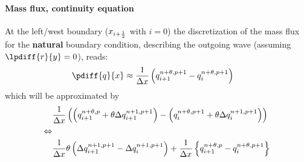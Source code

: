 \paragraph*{Mass flux, continuity equation}
At the left/west boundary ($x_{i+\frac{1}{2}}$ with $i=0$) the discretization of the mass flux for the \textbf{natural} boundary condition, describing the outgoing wave (assuming $\lpdiff{r}{y} = 0$), reads:
\begin{align}
    \pdiff{q}{x} & \approx \frac{1}{\Dx} \left(  q^{n+\theta, p+1}_{i+1} - q^{n+\theta, p+1}_{i} \right)
\end{align}
which will be approximated by
\begin{align}
    &\frac{1}{\Delta x} \left( \left( q^{n+\theta, p}_{i+1} + \theta \Delta q^{n+1, p+1}_{i+1}\right)
    - \left( q^{n+\theta, p+1}_{i} + \theta \Delta q^{n+1, p+1}_{i}\right) \right)
    \\
    \Leftrightarrow &
    \\
    &\frac{1 }{\Delta x} \theta \left( \Delta q^{n+1, p+1}_{i+1} - \Delta q^{n+1, p+1}_{i}\right) +
    \frac{1}{\Delta x} \left\{ q^{n+\theta, p}_{i+1} - q^{n+\theta, p+1}_{i} \right\}
\end{align}
